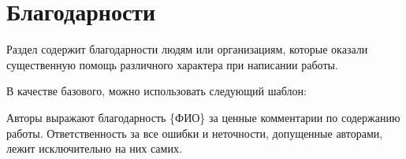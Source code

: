 \section{Благодарности}
\label{sec:Acknowledgement}

Раздел содержит благодарности людям или организациям, которые оказали существенную помощь различного характера при написании работы.

В качестве базового, можно использовать следующий шаблон:

Авторы выражают благодарность \{ФИО\} за ценные комментарии по содержанию работы. Ответственность за все ошибки и неточности, допущенные авторами, лежит исключительно на них самих.